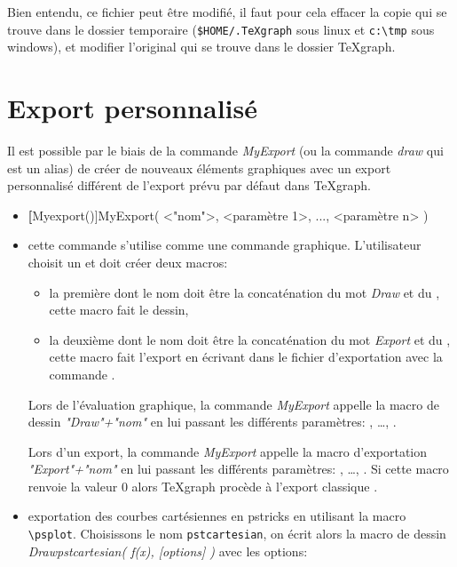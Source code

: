 Bien entendu, ce fichier peut être modifié, il faut pour cela effacer la copie qui se trouve dans le dossier temporaire (\verb|$HOME/.TeXgraph| sous linux et \verb|c:\tmp| sous windows), et modifier l'original qui se trouve dans le dossier TeXgraph.

\section{Export personnalisé}\label{cmdMyExport}

Il est possible par le biais de la commande \textsl{MyExport} (ou la commande \textsl{draw} qui est un alias) de créer de nouveaux éléments graphiques avec un export personnalisé différent de l'export prévu par défaut dans TeXgraph.

\begin{itemize}
 \item \textbf[Myexport()]{MyExport( <"nom">, <paramètre 1>, ..., <paramètre n> )}
 \item \desc cette commande s'utilise comme une commande graphique. L'utilisateur choisit un  et doit créer deux macros:
    \begin{itemize}
    \item la première dont le nom doit être la concaténation du mot \textit{Draw} et du , cette macro fait le dessin,
    \item la deuxième dont le nom doit être la concaténation du mot \textit{Export} et du , cette macro fait l'export en écrivant dans le fichier d'exportation avec la commande . 
    \end{itemize}

Lors de l'évaluation graphique, la commande \textsl{MyExport}  appelle la macro de dessin \textit{"Draw"+"nom"} en lui passant les différents paramètres: , \ldots, .

Lors d'un export, la commande \textsl{MyExport}  appelle la macro d'exportation \textit{"Export"+"nom"} en lui passant les différents paramètres: , \ldots, . Si cette macro renvoie la valeur $0$ alors TeXgraph procède à l'export \og classique \fg.

\item \exem exportation des courbes cartésiennes en pstricks en utilisant la macro \verb|\psplot|. Choisissons le nom \verb|pstcartesian|, on écrit alors la macro de dessin \textit{Drawpstcartesian( f(x), [options] )} avec les options:


\end{itemize}
